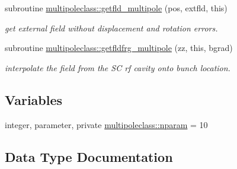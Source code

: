 \begin{DoxyCompactItemize}
subroutine \mbox{\hyperlink{namespacemultipoleclass_af4fb9d3cfd9db2d92930fcda605fbe26}{multipoleclass\+::getfld\+\_\+multipole}} (pos, extfld, this)
\begin{DoxyCompactList}\small\item\em get external field without displacement and rotation errors. \end{DoxyCompactList}\item 
subroutine \mbox{\hyperlink{namespacemultipoleclass_a8712b7622d8ed7c0e71cdc18204dcf46}{multipoleclass\+::getfldfrg\+\_\+multipole}} (zz, this, bgrad)
\begin{DoxyCompactList}\small\item\em interpolate the field from the SC rf cavity onto bunch location. \end{DoxyCompactList}\end{DoxyCompactItemize}
\subsection*{Variables}
\begin{DoxyCompactItemize}
\item 
integer, parameter, private \mbox{\hyperlink{namespacemultipoleclass_a67bb1a71461cf39cdd365adab7fec8b9}{multipoleclass\+::nparam}} = 10
\end{DoxyCompactItemize}


\subsection{Data Type Documentation}
\label{structmultipoleclass_1_1multipole}
